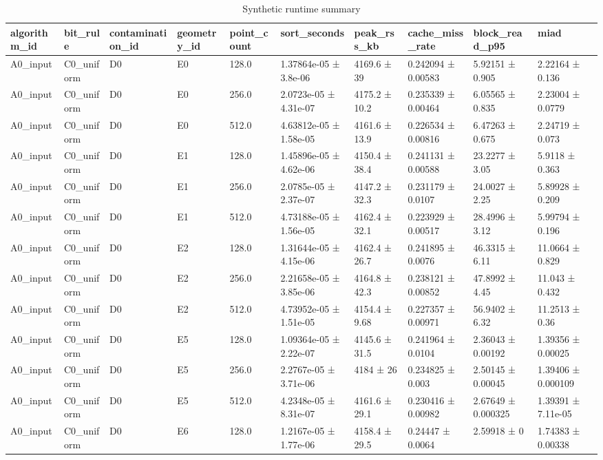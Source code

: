 \begin{table}
\caption{Synthetic runtime summary}
\label{tab:synthetic\_runtime}
\begin{tabular}{llllllllll}
\toprule
algorithm\_id & bit\_rule & contamination\_id & geometry\_id & point\_count & sort\_seconds & peak\_rss\_kb & cache\_miss\_rate & block\_read\_p95 & miad \\
\midrule
A0\_input & C0\_uniform & D0 & E0 & 128.0 & 1.37864e-05 ± 3.8e-06 & 4169.6 ± 39 & 0.242094 ± 0.00583 & 5.92151 ± 0.905 & 2.22164 ± 0.136 \\
A0\_input & C0\_uniform & D0 & E0 & 256.0 & 2.0723e-05 ± 4.31e-07 & 4175.2 ± 10.2 & 0.235339 ± 0.00464 & 6.05565 ± 0.835 & 2.23004 ± 0.0779 \\
A0\_input & C0\_uniform & D0 & E0 & 512.0 & 4.63812e-05 ± 1.58e-05 & 4161.6 ± 13.9 & 0.226534 ± 0.00816 & 6.47263 ± 0.675 & 2.24719 ± 0.073 \\
A0\_input & C0\_uniform & D0 & E1 & 128.0 & 1.45896e-05 ± 4.62e-06 & 4150.4 ± 38.4 & 0.241131 ± 0.00588 & 23.2277 ± 3.05 & 5.9118 ± 0.363 \\
A0\_input & C0\_uniform & D0 & E1 & 256.0 & 2.0785e-05 ± 2.37e-07 & 4147.2 ± 32.3 & 0.231179 ± 0.0107 & 24.0027 ± 2.25 & 5.89928 ± 0.209 \\
A0\_input & C0\_uniform & D0 & E1 & 512.0 & 4.73188e-05 ± 1.56e-05 & 4162.4 ± 32.1 & 0.223929 ± 0.00517 & 28.4996 ± 3.12 & 5.99794 ± 0.196 \\
A0\_input & C0\_uniform & D0 & E2 & 128.0 & 1.31644e-05 ± 4.15e-06 & 4162.4 ± 26.7 & 0.241895 ± 0.0076 & 46.3315 ± 6.11 & 11.0664 ± 0.829 \\
A0\_input & C0\_uniform & D0 & E2 & 256.0 & 2.21658e-05 ± 3.85e-06 & 4164.8 ± 42.3 & 0.238121 ± 0.00852 & 47.8992 ± 4.45 & 11.043 ± 0.432 \\
A0\_input & C0\_uniform & D0 & E2 & 512.0 & 4.73952e-05 ± 1.51e-05 & 4154.4 ± 9.68 & 0.227357 ± 0.00971 & 56.9402 ± 6.32 & 11.2513 ± 0.36 \\
A0\_input & C0\_uniform & D0 & E5 & 128.0 & 1.09364e-05 ± 2.22e-07 & 4145.6 ± 31.5 & 0.241964 ± 0.0104 & 2.36043 ± 0.00192 & 1.39356 ± 0.00025 \\
A0\_input & C0\_uniform & D0 & E5 & 256.0 & 2.2767e-05 ± 3.71e-06 & 4184 ± 26 & 0.234825 ± 0.003 & 2.50145 ± 0.00045 & 1.39406 ± 0.000109 \\
A0\_input & C0\_uniform & D0 & E5 & 512.0 & 4.2348e-05 ± 8.31e-07 & 4161.6 ± 29.1 & 0.230416 ± 0.00982 & 2.67649 ± 0.000325 & 1.39391 ± 7.11e-05 \\
A0\_input & C0\_uniform & D0 & E6 & 128.0 & 1.2167e-05 ± 1.77e-06 & 4158.4 ± 29.5 & 0.24447 ± 0.0064 & 2.59918 ± 0 & 1.74383 ± 0.00338 \\

\end{tabular}
\end{table}
